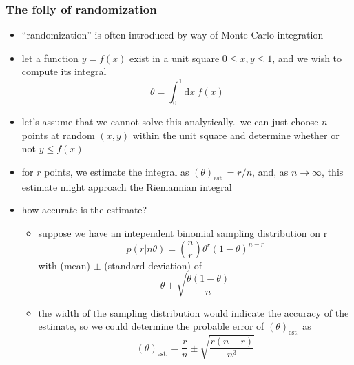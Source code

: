 \documentclass[../jaynes_prob_theory_notes.tex]{subfiles}
\begin{document}
            \subsubsection{The folly of randomization}
                \begin{itemize} 
                    \item ``randomization'' is often introduced by way of Monte Carlo integration
                    \item let a function \( y = f(x) \) exist in a unit square \(0 \leq x, y \leq 1\), and we wish to compute its integral
                        \begin{equation*} 
                            \theta = \int^{1}_{0} \text{d}x~f(x)
                        \end{equation*}
                    \item let's assume that we cannot solve this analytically.\ we can just choose \(n\) points at random \((x,y)\) within the unit square and determine whether or not \(y \leq f(x)\)
                    \item for \(r\) points, we estimate the integral as \({(\theta)}_{\text{est.}} = r/n \), and, as \(n \rightarrow \infty\), this estimate might approach the Riemannian integral
                    \item how accurate is the estimate?
                        \begin{itemize} 
                            \item suppose we have an intependent binomial sampling distribution on r
                                \begin{equation*} 
                                    p(r|n\theta) = \binom{n}{r} \theta^r {(1-\theta)}^{n-r}
                                \end{equation*}
                                with (mean) \(\pm\) (standard deviation) of
                                \begin{equation*} 
                                    \theta \pm \sqrt{\frac{\theta (1-\theta)}{n}}
                                \end{equation*}
                            \item the width of the sampling distribution would indicate the accuracy of the estimate, so we could determine the probable error of \({(\theta)}_{\text{est.}}\) as 
                                \begin{equation*} 
                                    {(\theta)}_{\text{est.}} = \frac{r}{n} \pm \sqrt{\frac{r(n-r)}{n^3}}

\end{equation*}
\end{itemize}
\end{itemize}
\end{document}
